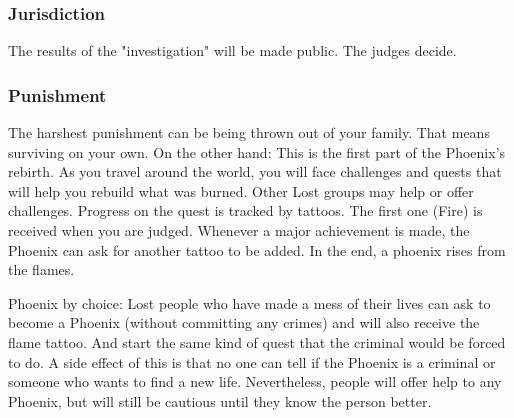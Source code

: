 \subsubsection{Jurisdiction}

The results of the "investigation" will be made public. The judges decide.

\subsubsection{Punishment}

The harshest punishment can be being thrown out of your family. That means surviving on your own. On the other hand: This is the first part of the Phoenix's rebirth. As you travel around the world, you will face challenges and quests that will help you rebuild what was burned. Other Lost groups may help or offer challenges.
Progress on the quest is tracked by tattoos. The first one (Fire) is received when you are judged. Whenever a major achievement is made, the Phoenix can ask for another tattoo to be added. In the end, a phoenix rises from the flames.

Phoenix by choice: Lost people who have made a mess of their lives can ask to become a Phoenix (without committing any crimes) and will also receive the flame tattoo. And start the same kind of quest that the criminal would be forced to do. A side effect of this is that no one can tell if the Phoenix is a criminal or someone who wants to find a new life. Nevertheless, people will offer help to any Phoenix, but will still be cautious until they know the person better.


